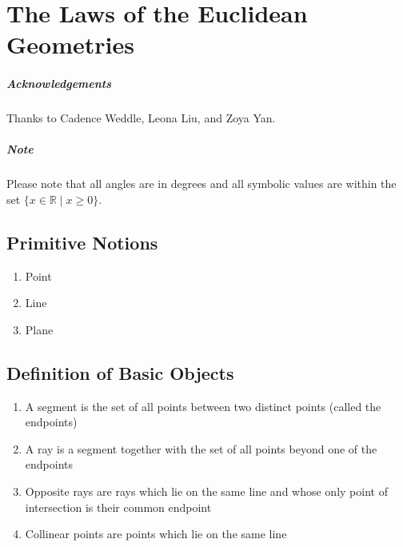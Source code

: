 \chapter{The Laws of the Euclidean Geometries}
\paragraph{Acknowledgements}
Thanks to Cadence Weddle, Leona Liu, and Zoya Yan.
\paragraph{Note}
Please note that all angles are in degrees and all symbolic values are within the set $\{x\in\mathbb{R} \mid x\geq0\}$.
\section*{Primitive Notions}
\begin{enumerate}
    \item Point
    \item Line
    \item Plane
\end{enumerate}

\section*{Definition of Basic Objects}
\begin{enumerate}
     \item A segment is the set of all points between two distinct points (called the endpoints)
     \item A ray is a segment together with the set of all points beyond one of the endpoints
     \item Opposite rays are rays which lie on the same line and whose only point of intersection is their common endpoint
     \item Collinear points are points which lie on the same line\end{enumerate}


